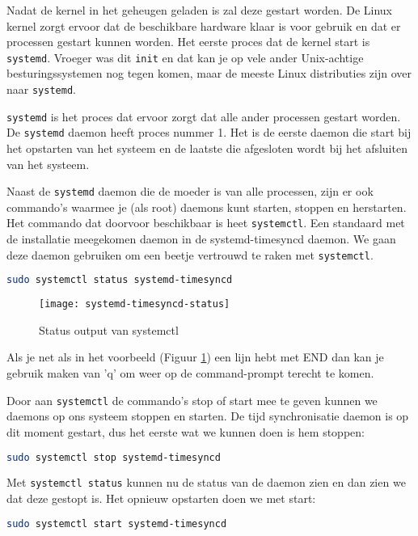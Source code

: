 Nadat de kernel in het geheugen geladen is zal deze gestart worden. De Linux kernel zorgt ervoor dat de beschikbare hardware klaar is voor gebruik en dat er processen gestart kunnen worden. Het eerste proces dat de kernel start is \texttt{systemd}. Vroeger was dit \texttt{init} en dat kan je op vele ander Unix-achtige besturingssystemen nog tegen komen, maar de meeste Linux distributies zijn over naar \texttt{systemd}.

\texttt{systemd} is het proces dat ervoor zorgt dat alle ander processen gestart worden. De \texttt{systemd} daemon heeft proces nummer 1. Het is de eerste daemon die start bij het opstarten van het systeem en de laatste die afgesloten wordt bij het afsluiten van het systeem.

Naast de \texttt{systemd} daemon die de moeder is van alle processen, zijn er ook commando's waarmee je (als root) daemons kunt starten, stoppen en herstarten. Het commando dat doorvoor beschikbaar is heet \texttt{systemctl}. Een standaard met de installatie meegekomen daemon in de systemd-timesyncd daemon. We gaan deze daemon gebruiken om een beetje vertrouwd te raken met \texttt{systemctl}.

\begin{lstlisting}[language=bash]
sudo systemctl status systemd-timesyncd
\end{lstlisting}

\begin{figure}[h]
\texttt{[image: systemd-timesyncd-status]}
\centering
	\caption{Status output van systemctl}
	\label{scrn:systemd-timesyncd-status}
\end{figure}

Als je net als in het voorbeeld (Figuur \ref{scrn:systemd-timesyncd-status}) een lijn hebt met END dan kan je gebruik maken van 'q' om weer op de command-prompt terecht te komen.

Door aan \texttt{systemctl} de commando's stop of start mee te geven kunnen we daemons op ons systeem stoppen en starten. De tijd synchronisatie daemon is op dit moment gestart, dus het eerste wat we kunnen doen is hem stoppen:

\begin{lstlisting}[language=bash]
sudo systemctl stop systemd-timesyncd
\end{lstlisting}

Met \texttt{systemctl status} kunnen nu de status van de daemon zien en dan zien we dat deze gestopt is. Het opnieuw opstarten doen we met start:

\begin{lstlisting}[language=bash]
sudo systemctl start systemd-timesyncd
\end{lstlisting}

